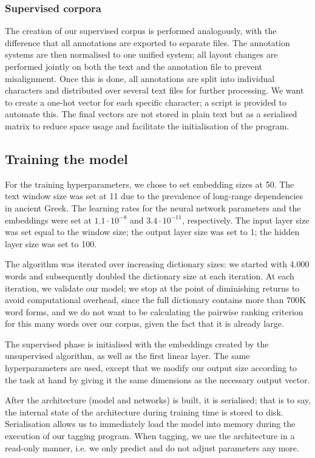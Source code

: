 \subsubsection{Supervised corpora}
\label{sec:supcorp}
The creation of our supervised corpus is performed analogously, with
the difference that all annotations are exported to separate
files. The annotation systems are then normalised to one unified
system; all layout changes are performed jointly on both the text and
the annotation file to prevent misalignment. Once this is done, all
annotations are split into individual characters and distributed over
several text files for further processing. We want to create a one-hot
vector for each specific character; a script is provided to automate
this. The final vectors are not stored in plain text but as a
serialised matrix to reduce space usage and facilitate the
initialisation of the program.

\subsection{Training the model}
\label{sec:createmodel}

For the training hyperparameters, we chose to set embedding sizes at
50. The text window size was set at 11 due to the prevalence of
long-range dependencies in ancient Greek. The learning rates for the
neural network parameters and the embeddings were set at $1.1 \cdot
10^{-8}$ and $3.4 \cdot 10^{-11}$, respectively. The input layer size
was set equal to the window size; the output layer size was set to 1;
the hidden layer size was set to 100.

The algorithm was iterated over increasing dictionary sizes: we
started with 4.000 words and subsequently doubled the dictionary size
at each iteration. At each iteration, we validate our model; we stop
at the point of diminishing returns to avoid computational overhead,
since the full dictionary contains more than 700K word forms, and we
do not want to be calculating the pairwise ranking criterion for this
many words over our corpus, given the fact that it is already large.

The supervised phase is initialised with the embeddings created by the
unsupervised algorithm, as well as the first linear layer. The same
hyperparameters are used, except that we modify our output size
according to the task at hand by giving it the same dimensions as the
necessary output vector.

After the architecture (model and networks) is built, it is
serialised; that is to say, the internal state of the architecture
during training time is stored to disk. Serialisation allows us to
immediately load the model into memory during the execution of our
tagging program. When tagging, we use the architecture in a read-only
manner, i.e. we only predict and do not adjust parameters any more.

